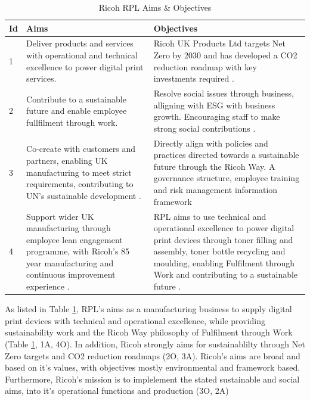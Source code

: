 \documentclass{article}
\begin{document}
\begin{table}[h!]
    \centering
    \caption{Ricoh RPL Aims \& Objectives}
    \label{tab:rpl-aims-objectives}
    \begin{tabular}{|p{0.7cm}|p{6cm}|p{7.5cm}|}
        \hline
        \textbf{Id} & \textbf{Aims}        & \textbf{Objectives}                                                                                                                                                                                                                   \\
        \hline
        1
        & Deliver products and services with operational and technical excellence to power digital print services.
        & Ricoh UK Products Ltd targets Net Zero by 2030 and has developed a CO2 reduction roadmap with key investments required \parencite{rpl-environmental}. \\
        \hline
        2
        & Contribute to a sustainable future and enable employee fullfilment through work. \parencite{rpl-business}
        & Resolve social issues through business, alligning with ESG with business growth. Encouraging staff to make strong social contributions \parencite{rpl-social}. \\
        \hline
        3
        & Co-create with customers and partners, enabling UK manufacturing to meet strict requirements, contributing to UN's sustainable development \parencite{co-creation}.
        & Directly align with policies and practices directed towards a sustainable future through the Ricoh Way. A governance structure, employee training and risk management information framework \parencite{rpl-governance} \\
        \hline
        4
        & Support wider UK manufacturing through employee lean engagement programme, with Ricoh's 85 year manufacturing and continuous improvement experience \parencite{rpl-philosophy}.
        & RPL aims to use technical and operational excellence to power digital print devices through toner filling and assembly, toner bottle recycling and moulding, enabling Fulfilment through Work and contributing to a sustainable future \parencite{rpl-business}. \\
        \hline
    \end{tabular}
\end{table}

As listed in Table \ref{tab:rpl-aims-objectives}, RPL’s aims as a manufacturing business to supply digital print devices with technical and operational excellence, while providing sustainability work and the Ricoh Way philosophy of Fulfilment through Work (Table \ref{tab:rpl-aims-objectives}, 1A, 4O).
In addition, Ricoh strongly aims for sustainablilty through Net Zero targets and CO2 reduction roadmaps (2O, 3A).
Ricoh's aims are broad and based on it's values, with objectives mostly environmental and framework based.
Furthermore, Ricoh's mission is to implelement the stated sustainable and social aims, into it's operational functions and production (3O, 2A)
\end{document}
